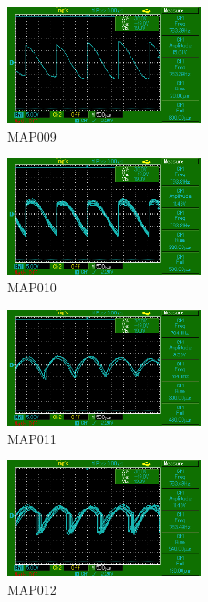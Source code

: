 \begin{figure}
    \centering
    \includegraphics[width=0.5\textwidth]{bilder/MAP009.png}
    \caption{MAP009}        
    \label{fig:MAP009}
\end{figure}

\begin{figure}
    \centering
    \includegraphics[width=0.5\textwidth]{bilder/MAP010.png}
    \caption{MAP010}        
    \label{fig:MAP010}
\end{figure}

\begin{figure}
    \centering
    \includegraphics[width=0.5\textwidth]{bilder/MAP011.png}
    \caption{MAP011}        
    \label{fig:MAP011}
\end{figure}

\begin{figure}
    \centering
    \includegraphics[width=0.5\textwidth]{bilder/MAP012.png}
    \caption{MAP012}        
    \label{fig:MAP012}
\end{figure}
